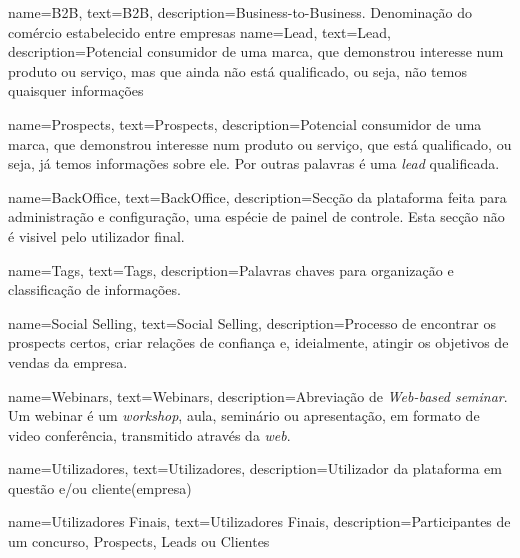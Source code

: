 {
        name=B2B,
        text=B2B,
        description={Business-to-Business. Denominação do comércio estabelecido entre empresas}
}
{
	name=Lead,
	text=Lead,
	description={Potencial consumidor de uma marca, que demonstrou interesse num produto ou serviço, mas que ainda não está qualificado, ou seja, não temos quaisquer informações}
}

{
	name=Prospects,
	text=Prospects,
	description={Potencial consumidor de uma marca, que demonstrou interesse num produto ou serviço, que está qualificado, ou seja, já temos informações sobre ele. Por outras palavras é uma \textit{lead} qualificada.}
}

{
	name=BackOffice,
	text=BackOffice,
	description={Secção da plataforma feita para administração e configuração, uma espécie de painel de controle. Esta secção não é visivel pelo utilizador final. }
}

{
	name=Tags,
	text=Tags,
	description={Palavras chaves para organização e classificação de informações. }
}

{
	name=Social Selling,
	text=Social Selling,
	description={Processo de encontrar os prospects certos, criar relações de confiança e, ideialmente, atingir os objetivos de vendas da empresa.}
}

{
	name=Webinars,
	text=Webinars,
	description={Abreviação de \textit{Web-based seminar}. Um webinar é um \textit{workshop}, aula, seminário ou apresentação, em formato de video conferência, transmitido através da \textit{web}.}
}

{
	name=Utilizadores,
	text=Utilizadores,
	description={Utilizador da plataforma em questão e/ou cliente(empresa)}
}

{
	name=Utilizadores Finais,
	text=Utilizadores Finais,
	description={Participantes de um concurso, Prospects, Leads ou  Clientes}
}